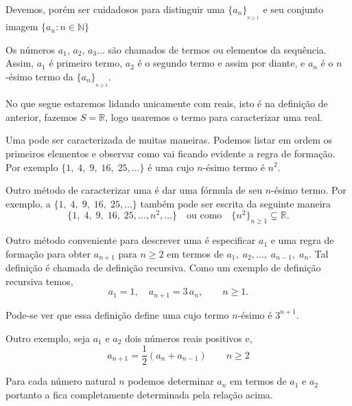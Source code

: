 Devemos, por\'{e}m ser cuidadosos para distinguir uma \seq $\{a_n\}_{_{n\geq 1}}$ e seu conjunto imagem 
$\{a_n\colon n\in \mathbb{N}\}$

Os n\'{u}meros $a_1$, $a_2$, $a_3\ldots$ s\~{a}o chamados de termos ou elementos da sequ\^{e}ncia. Assim, $a_1$ \'{e} primeiro termo, $a_2$ \'{e} o segundo termo e assim por diante, e $a_n$ \'{e} o $n$-\'{e}simo termo da \seq $\{a_n\}_{_{n\geq 1}}$.

No que segue estaremos lidando unicamente com \seqs reais, isto \'{e} na defini\c{c}\~{a}o de \seq anterior, fazemos $S=\mathbb{R}$, logo usaremos o termo \seq para caracterizar uma \seq real.

Uma \seq pode ser caracterizada de muitas maneiras. Podemos
listar em ordem os primeiros elementos e observar como vai ficando
evidente a regra de forma\c{c}\~{a}o. Por exemplo $\{1,\; 4,\; 9,\; 16,\; 25,\ldots\}$
\'{e} uma \seq cujo $n$-\'{e}simo termo \'{e} $n^2$.

Outro m\'{e}todo de caracterizar uma \seq \'{e} dar uma f\'{o}rmula de seu $n$-\'{e}simo termo. Por exemplo, a \seq $\{1,\; 4,\; 9,\; 16,\; 25,\ldots\}$
tamb\'{e}m pode ser escrita da seguinte maneira 
\begin{equation*}
\{1,\; 4,\; 9,\; 16,\; 25,\ldots, n^{2},\ldots \} \quad \text{ou como} \quad  \{n^2\}_{n\geq 1}\subsetneq \mathbb{R}.
\end{equation*}

Outro m\'{e}todo conveniente para descrever uma \seq \'{e} especificar
$a_1$ e uma regra de forma\c{c}\~{a}o para obter $a_{n+1}$ para $n\geq 2$
em termos de $a_1,\; a_2,\ldots,\; a_{n-1},\;a_n$. Tal defini\c{c}\~{a}o \'{e} chamada de defini\c{c}\~{a}o recursiva. Como um exemplo de defini\c{c}\~{a}o recursiva
temos,
\begin{equation*}
  a_1=1,\quad a_{n+1}=3\,a_n,\qquad n\geq 1.
\end{equation*}

Pode-se ver que essa defini\c{c}\~{a}o define uma \seq cujo termo $n$-\'{e}simo \'{e} $3^{n+1}$.

Outro exemplo, seja $a_1$ e $a_2$ dois n\'{u}meros reais positivos e,
\begin{equation*}
  a_{n+1}=\frac{1}{2}(a_n+a_{n-1})\qquad n\geq 2
\end{equation*}

Para cada n\'{u}mero natural $n$ podemos determinar $a_n$ em termos de
$a_1$ e $a_2$ portanto a \seq fica completamente determinada
pela rela\c{c}\~{a}o acima.

